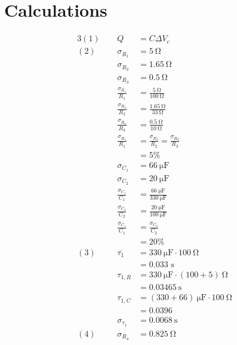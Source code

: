 \documentclass[12pt]{article}
\begin{document}
    \section{Calculations}
        \begin{alignat*}{3}
            (1)\ \ &&
            Q&=C\Delta V_c\\
            (2)\ \ 
            &&\sigma_{R_1} & = 5\mathrm{\ \Omega}\\
            &&\sigma_{R_2} & = 1.65\mathrm{\ \Omega}\\
            &&\sigma_{R_3} & = 0.5\mathrm{\ \Omega}\\
            &&\frac{\sigma_{R_1}}{R_1} & = \frac{5 \mathrm{\ \Omega}}{100 \mathrm{\ \Omega}}\\
            &&\frac{\sigma_{R_2}}{R_2} & = \frac{1.65 \mathrm{\ \Omega}}{33 \mathrm{\ \Omega}}\\
            &&\frac{\sigma_{R_3}}{R_3} & = \frac{0.5 \mathrm{\ \Omega}}{10 \mathrm{\ \Omega}}\\
            &&\frac{\sigma_{R_1}}{R_1} & = \frac{\sigma_{R_2}}{R_2} = \frac{\sigma_{R_3}}{R_3}\\
            &&&=5\%\\
            &&\sigma_{C_1} &= 66\ \mathrm{\mu F}\\
            &&\sigma_{C_2} &= 20\ \mathrm{\mu F}\\
            &&\frac{\sigma_{C_1}}{C_1} &= \frac{66\ \mathrm{\mu F}}{330\ \mathrm{\mu F}}\\
            &&\frac{\sigma_{C_2}}{C_2} &= \frac{20\ \mathrm{\mu F}}{100\ \mathrm{\mu F}}\\
            &&\frac{\sigma_{C_1}}{C_1} &=\frac{\sigma_{C_2}}{C_2}\\
            &&& = 20\%\\
            (3)\ \
            &&\overline{\tau_1} &= 330 \ \mathrm{\mu F} \cdot 100 \ \mathrm{\Omega}\\
            &&&=0.033\text{ s}\\
            &&\tau_{1,R} &= 330 \ \mathrm{\mu F} \cdot (100+5) \ \mathrm{\Omega}\\
            &&& = 0.03465\ \mathrm{s}\\
            &&\tau_{1,C} &= (330+66)\ \mathrm{\mu F} \cdot 100 \ \mathrm{\Omega}\\
            &&&=0.0396\\
            &&\sigma_{\tau_1} &= 0.0068\ \text{s}\\
            (4)\ \
            &&\sigma_{R_4} & = 0.825\mathrm{\ \Omega}\\

\end{alignat*}
\end{document}
